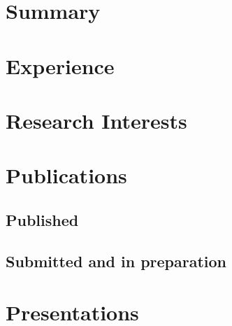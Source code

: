 \documentclass[letterpaper]{twentysecondcv} %
\begin{document}
\makeprofile %
 

\section{Summary}

\section{Experience}

\begin{twenty} %
\end{twenty}

\newpage
{}
\section{Research Interests}
\begin{itemize}
\end{itemize}

\section{Publications}
\subsection{Published}
\begin{itemize}
\end{itemize}

\subsection{Submitted and in preparation}
\begin{itemize}
\end{itemize}

\section{Presentations}
\begin{twenty}
\end{twenty}
\end{document}
